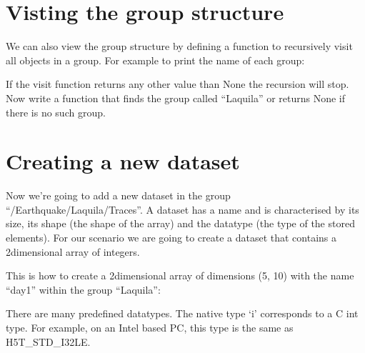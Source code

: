 \documentclass[letterpaper,10pt,english]{sphinxmanual}
\begin{document}
\section{Visting the group structure}
\label{\detokenize{index:visting-the-group-structure}}
\sphinxAtStartPar
We can also view the group structure by defining a function to recursively visit all objects in a group. For example to print the name of each group:

\begin{sphinxVerbatim}[commandchars=\\\{\}]
 

\end{sphinxVerbatim}

\sphinxAtStartPar
If the visit function returns any other value than None the recursion will stop. Now write a function that finds the group called “Laquila” or returns None if there is no such group.


\section{Creating a new dataset}
\label{\detokenize{index:creating-a-new-dataset}}
\sphinxAtStartPar
Now we’re going to add a new dataset in the group “/Earthquake/Laquila/Traces”.
A dataset has a name and is characterised by its size, its shape (the shape of the array) and the datatype (the type of the stored elements).
For our scenario we are going to create a dataset that contains a 2\sphinxhyphen{}dimensional array of integers.

\sphinxAtStartPar
This is how to create a 2\sphinxhyphen{}dimensional array of dimensions (5, 10) with the name “day1” within the group “Laquila”:

\begin{sphinxVerbatim}[commandchars=\\\{\}]
    
\end{sphinxVerbatim}

\sphinxAtStartPar
There are many predefined datatypes. The native type ‘i’ corresponds to a C int type. For example, on an Intel based PC, this type is the same as H5T\_STD\_I32LE.
\end{document}
